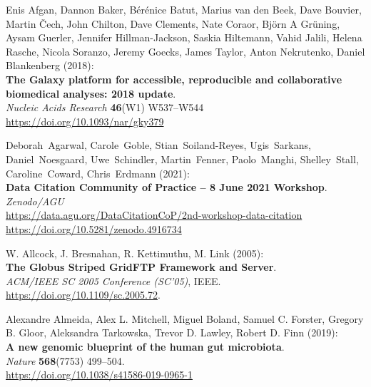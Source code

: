 
\begin{thebibliography}{9}

Enis Afgan, Dannon Baker, Bérénice Batut, Marius van
den Beek, Dave Bouvier, Martin Čech, John Chilton, Dave Clements, Nate
Coraor, Björn A Grüning, Aysam Guerler, Jennifer Hillman-Jackson, Saskia
Hiltemann, Vahid Jalili, Helena Rasche, Nicola Soranzo, Jeremy Goecks,
James Taylor, Anton Nekrutenko, Daniel Blankenberg (2018):\\
\textbf{The Galaxy platform for accessible, reproducible and
collaborative biomedical analyses: 2018 update}.\\
\emph{Nucleic Acids Research} \textbf{46}(W1) W537--W544\\
\url{https://doi.org/10.1093/nar/gky379}

Deborah~Agarwal, Carole~Goble, Stian~Soiland-Reyes,
Ugis~Sarkans, Daniel~Noesgaard, Uwe~Schindler, Martin~Fenner,
Paolo~Manghi, Shelley~Stall, Caroline~Coward, Chris~Erdmann (2021):\\
\textbf{Data Citation Community of Practice -- 8 June 2021 Workshop}.\\
\emph{Zenodo/AGU}\\
\url{https://data.agu.org/DataCitationCoP/2nd-workshop-data-citation}\\
\url{https://doi.org/10.5281/zenodo.4916734}

W. Allcock, J. Bresnahan, R. Kettimuthu, M. Link (2005):\\
\textbf{The Globus Striped GridFTP Framework and Server}.\\
\emph{ACM/IEEE SC 2005 Conference (SC'05)}, IEEE.
\url{https://doi.org/10.1109/sc.2005.72}.

Alexandre Almeida, Alex L. Mitchell, Miguel Boland, Samuel C.
Forster, Gregory B. Gloor, Aleksandra Tarkowska, Trevor D. Lawley,
Robert D. Finn (2019):\\
\textbf{A new genomic blueprint of the human gut microbiota}.\\
\emph{Nature} \textbf{568}(7753) 499--504.\\
\url{https://doi.org/10.1038/s41586-019-0965-1}


\end{thebibliography}

